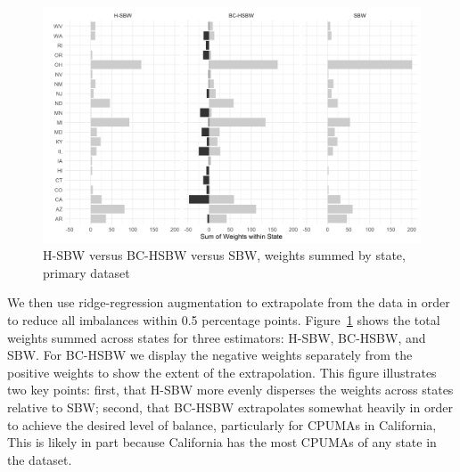 \documentclass[aoas]{imsart}
\theoremstyle{plain}
\theoremstyle{remark}
\begin{document}
\begin{figure}[H]
\begin{center}
    \caption{H-SBW versus BC-HSBW versus SBW, weights summed by state, primary dataset}
    \label{fig:sbwvhsbw1}
    \includegraphics[scale=0.6]{01_Plots/weights-by-state-sbw-hsbw-c1.png}
\end{center}
\end{figure}

We then use ridge-regression augmentation to extrapolate from the data in order to reduce all imbalances within 0.5 percentage points. Figure~\ref{fig:sbwvhsbw1} shows the total weights summed across states for three estimators: H-SBW, BC-HSBW, and SBW. For BC-HSBW we display the negative weights separately from the positive weights to show the extent of the extrapolation. This figure illustrates two key points: first, that H-SBW more evenly disperses the weights across states relative to SBW; second, that BC-HSBW extrapolates somewhat heavily in order to achieve the desired level of balance, particularly for CPUMAs in California, This is likely in part because California has the most CPUMAs of any state in the dataset.
\end{document}
